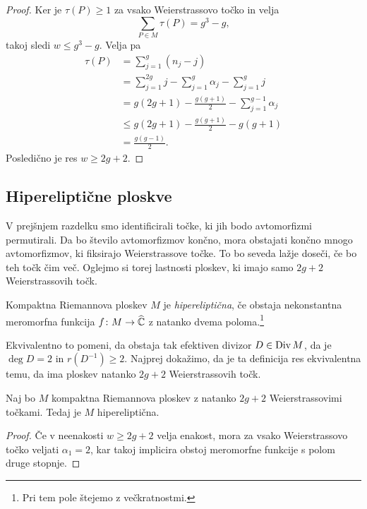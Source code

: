 \begin{proof}
Ker je $\tau(P) \geq 1$ za vsako Weierstrassovo točko in velja
\[
\sum_{P \in M} \tau(P) = g^3 - g,
\]
takoj sledi $w \leq g^3 - g$. Velja pa
\begin{align*}
\tau(P) &= \sum_{j=1}^g (n_j - j)
\\
&=
\sum_{j=1}^{2g} j - \sum_{j=1}^g \alpha_j - \sum_{j=1}^g j
\\
&=
g(2g+1) - \frac{g(g+1)}{2} - \sum_{j=1}^{g-1} \alpha_j
\\
&\leq
g(2g+1) - \frac{g(g+1)}{2} - g(g+1)
\\
&=
\frac{g(g-1)}{2}.
\end{align*}
Posledično je res $w \geq 2g + 2$.
\end{proof}

\subsection{Hipereliptične ploskve}

V prejšnjem razdelku smo identificirali točke, ki jih bodo
avtomorfizmi permutirali. Da bo število avtomorfizmov končno, mora
obstajati končno mnogo avtomorfizmov, ki fiksirajo Weierstrassove
točke. To bo seveda lažje doseči, če bo teh točk čim več. Oglejmo
si torej lastnosti ploskev, ki imajo samo $2g + 2$ Weierstrassovih
točk.

\begin{definicija}
Kompaktna Riemannova ploskev $M$ je \emph{hipereliptična}, če
obstaja nekonstantna meromorfna funkcija $f \colon M \to \widehat{\mathbb{C}}$ z
natanko dvema poloma.\footnote{Pri tem pole štejemo z
večkratnostmi.}
\end{definicija}

Ekvivalentno to pomeni, da obstaja tak efektiven divizor
$D \in \operatorname{Div} M$, da je $\deg D = 2$ in $r(D^{-1}) \geq 2$. Najprej
dokažimo, da je ta definicija res ekvivalentna temu, da ima ploskev
natanko $2g + 2$ Weierstrassovih točk.

\begin{trditev}
Naj bo $M$ kompaktna Riemannova ploskev z natanko $2g + 2$
Weierstrassovimi točkami. Tedaj je $M$ hipereliptična.
\end{trditev}

\begin{proof}
Če v neenakosti $w \geq 2g + 2$ velja enakost, mora za vsako
Weierstrassovo točko veljati $\alpha_1 = 2$, kar takoj implicira
obstoj meromorfne funkcije s polom druge stopnje.
\end{proof}

